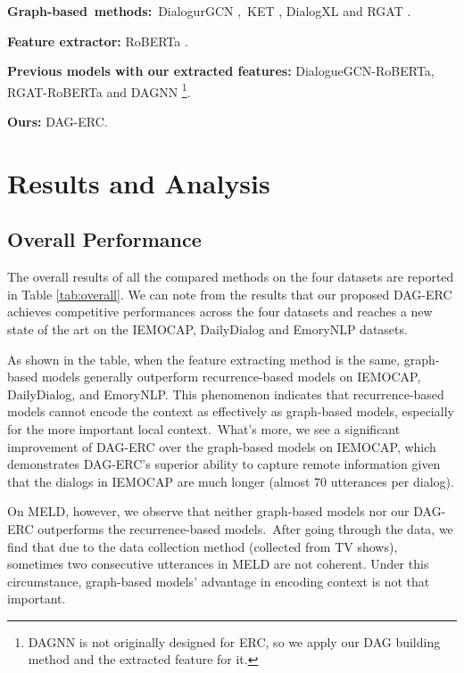 \documentclass[11pt,a4paper]{article}
\begin{document}
\noindent\textbf{Graph-based~methods:}~DialogurGCN \citep{ghosal2019dialoguegcn},~KET \citep{zhong2019knowledge}, DialogXL \citep{shen2020dialogxl} and RGAT \citep{ishiwatari2020relation}.


\noindent \textbf{Feature extractor:} RoBERTa \citep{liu2019roberta}. 

\noindent \textbf{Previous models with our extracted features:}  DialogueGCN-RoBERTa, RGAT-RoBERTa and DAGNN \citep{thost2021directed}\footnote{DAGNN is not originally designed for ERC, so we apply our DAG building method and the extracted feature for it.}.

\noindent \textbf{Ours:} DAG-ERC.


\section{Results and Analysis}




\subsection{Overall Performance}
The overall results of all the compared methods on the four datasets are reported in Table \ref{tab:overall}. We can note from the results that our proposed DAG-ERC achieves competitive performances across the four datasets and reaches a new state of the art on the IEMOCAP, DailyDialog and EmoryNLP datasets.


As shown in the table, when the feature extracting method is the same, graph-based models generally outperform recurrence-based models on IEMOCAP, DailyDialog, and EmoryNLP. 
This phenomenon indicates that recurrence-based models cannot encode the context as effectively as graph-based models, especially for the more important local context.~What's more, we see a significant improvement of DAG-ERC over the graph-based models on IEMOCAP, which demonstrates DAG-ERC's superior ability to capture remote information given that the dialogs in IEMOCAP are much longer (almost 70 utterances per dialog).


On MELD, however, we observe that neither graph-based models nor our DAG-ERC outperforms the recurrence-based models.~After going through the data, we find that due to the data collection method (collected from TV shows), sometimes two consecutive utterances in MELD are not coherent. Under this circumstance, graph-based models' advantage in encoding context is not that important. 
\end{document}
